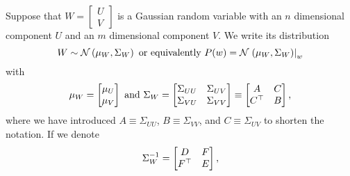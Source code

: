 Suppose that $W = \begin{bmatrix} U \\ V \end{bmatrix}$ is a Gaussian
random variable with an $n$ dimensional component $U$ and an $m$
dimensional component $V$.  We write its distribution
%
%
\begin{equation*}
  W \sim {\mathcal{N}} \left( \mu_W,\Sigma_W \right) \text{ or equivalently
  } P(w) = {\mathcal{N}}\left.\left(\mu_W,\Sigma_W\right)\right|_{w}
\end{equation*}
with
\begin{equation*}
  \mu_W = \begin{bmatrix} \mu_U\\\mu_V \end{bmatrix} \text{ and }
  \Sigma_W =   \begin{bmatrix} \Sigma_{UU} & \Sigma_{UV}\\ \Sigma_{VU}
  & \Sigma_{VV} \end{bmatrix} \equiv \begin{bmatrix} A & C \\
  C^\top & B \end{bmatrix},
\end{equation*}
where we have introduced $A \equiv \Sigma_{UU}$, $B \equiv
\Sigma_{VV}$, and $C \equiv \Sigma_{UV}$ to shorten the notation.
If we denote
\begin{equation*}
    \Sigma_W^{-1} =   \begin{bmatrix} D & F \\ F^\top & E
  \end{bmatrix},
\end{equation*}
